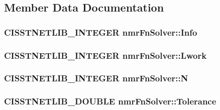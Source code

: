 \subsection{Member Data Documentation}
\hypertarget{classnmr_fn_solver_a2c7acbdbe21f78d6e26b82fa502a9935}{}
\subsubsection[{Info}]{\setlength{\rightskip}{0pt plus 5cm}C\+I\+S\+S\+T\+N\+E\+T\+L\+I\+B\+\_\+\+I\+N\+T\+E\+G\+E\+R nmr\+Fn\+Solver\+::\+Info\hspace{0.3cm}{\ttfamily [protected]}}\label{classnmr_fn_solver_a2c7acbdbe21f78d6e26b82fa502a9935}
\hypertarget{classnmr_fn_solver_a713fa3d60bd31f757d9c3cf04fc8f6c8}{}
\subsubsection[{Lwork}]{\setlength{\rightskip}{0pt plus 5cm}C\+I\+S\+S\+T\+N\+E\+T\+L\+I\+B\+\_\+\+I\+N\+T\+E\+G\+E\+R nmr\+Fn\+Solver\+::\+Lwork\hspace{0.3cm}{\ttfamily [protected]}}\label{classnmr_fn_solver_a713fa3d60bd31f757d9c3cf04fc8f6c8}
\hypertarget{classnmr_fn_solver_a19a2ba2ba0e6e1f4ddd7eb137550c1d8}{}
\subsubsection[{N}]{\setlength{\rightskip}{0pt plus 5cm}C\+I\+S\+S\+T\+N\+E\+T\+L\+I\+B\+\_\+\+I\+N\+T\+E\+G\+E\+R nmr\+Fn\+Solver\+::\+N\hspace{0.3cm}{\ttfamily [protected]}}\label{classnmr_fn_solver_a19a2ba2ba0e6e1f4ddd7eb137550c1d8}
\hypertarget{classnmr_fn_solver_acde9b05d6fb9fbc8aad45b2cbf63f6b6}{}
\subsubsection[{Tolerance}]{\setlength{\rightskip}{0pt plus 5cm}C\+I\+S\+S\+T\+N\+E\+T\+L\+I\+B\+\_\+\+D\+O\+U\+B\+L\+E nmr\+Fn\+Solver\+::\+Tolerance\hspace{0.3cm}{\ttfamily [protected]}}\label{classnmr_fn_solver_acde9b05d6fb9fbc8aad45b2cbf63f6b6}
\hypertarget{classnmr_fn_solver_ac641a0ef17a172725774a7b5703f95aa}{}
